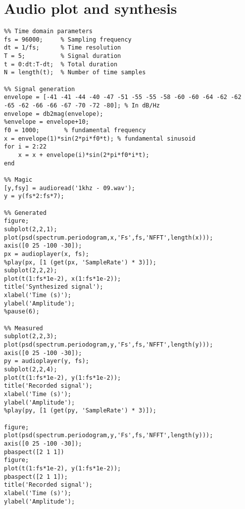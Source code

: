 \section{Audio plot and synthesis}
\begin{lstlisting}
%% Time domain parameters
fs = 96000;     % Sampling frequency
dt = 1/fs;      % Time resolution
T = 5;          % Signal duration
t = 0:dt:T-dt;  % Total duration
N = length(t);  % Number of time samples

%% Signal generation
envelope = [-41 -41 -44 -40 -47 -51 -55 -55 -58 -60 -60 -64 -62 -62 -65 -62 -66 -66 -67 -70 -72 -80]; % In dB/Hz
envelope = db2mag(envelope);
%envelope = envelope+10;
f0 = 1000;       % fundamental frequency
x = envelope(1)*sin(2*pi*f0*t); % fundamental sinusoid
for i = 2:22
    x = x + envelope(i)*sin(2*pi*f0*i*t);
end

%% Magic
[y,fsy] = audioread('1khz - 09.wav');
y = y(fs*2:fs*7);

%% Generated
figure;
subplot(2,2,1);
plot(psd(spectrum.periodogram,x,'Fs',fs,'NFFT',length(x)));
axis([0 25 -100 -30]);
px = audioplayer(x, fs);
%play(px, [1 (get(px, 'SampleRate') * 3)]);
subplot(2,2,2);
plot(t(1:fs*1e-2), x(1:fs*1e-2));
title('Synthesized signal');
xlabel('Time (s)');
ylabel('Amplitude');
%pause(6);

%% Measured
subplot(2,2,3);
plot(psd(spectrum.periodogram,y,'Fs',fs,'NFFT',length(y)));
axis([0 25 -100 -30]);
py = audioplayer(y, fs);
subplot(2,2,4);
plot(t(1:fs*1e-2), y(1:fs*1e-2));
title('Recorded signal');
xlabel('Time (s)');
ylabel('Amplitude');
%play(py, [1 (get(py, 'SampleRate') * 3)]);

figure;
plot(psd(spectrum.periodogram,y,'Fs',fs,'NFFT',length(y)));
axis([0 25 -100 -30]);
pbaspect([2 1 1])
figure;
plot(t(1:fs*1e-2), y(1:fs*1e-2));
pbaspect([2 1 1]);
title('Recorded signal');
xlabel('Time (s)');
ylabel('Amplitude');
\end{lstlisting}